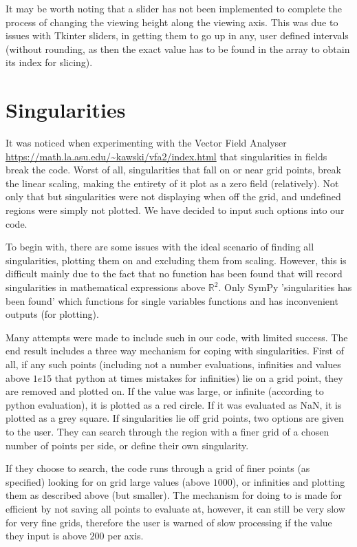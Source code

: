 \documentclass[11]{report}
\begin{document}
It may be worth noting that a slider has not been implemented to complete the process of changing the viewing height along the viewing axis. This was  due to issues with Tkinter sliders, in getting them to go up in any, user defined intervals (without rounding, as then the exact value has to be found in the array to obtain its index for slicing).

\section{Singularities}
It was noticed when experimenting with the Vector Field Analyser \url{https://math.la.asu.edu/~kawski/vfa2/index.html} that singularities in fields break the code. Worst of all, singularities that fall on or near grid points, break the linear scaling, making the entirety of it plot as a zero field (relatively). Not only that but singularities were not displaying when off the grid, and undefined regions were simply not plotted. We have decided to input such options into our code.

To begin with, there are some issues with the ideal scenario of finding all singularities, plotting them on and excluding them from scaling. However, this is difficult mainly due to the fact that no function has been found that will record singularities in mathematical expressions above $\mathbb{R}^{2}$. Only SymPy 'singularities has been found' which functions for single variables functions and has inconvenient outputs (for plotting).

Many attempts were made to include such in our code, with limited success.
The end result includes a three way mechanism for coping with singularities.
First of all, if any such points (including not a number evaluations, infinities and values above $1e15$ that python at times mistakes for infinities) lie on a grid point, they are removed and plotted on. If the value was large, or infinite (according to python evaluation), it is plotted as a red circle. If it was evaluated as NaN, it is plotted as a grey square.
If singularities lie off grid points, two options are given to the user. They can search through the region with a finer grid of a chosen number of points per side, or define their own singularity.

If they choose to search, the code runs through a grid of finer points (as specified) looking for on grid large values (above $1000$), or infinities and plotting them as described above (but smaller). The mechanism for doing to is made for efficient by not saving all points to evaluate at, however, it can still be very slow for very fine grids, therefore the user is warned of slow processing if the value they input is above $200$ per axis.
\end{document}
